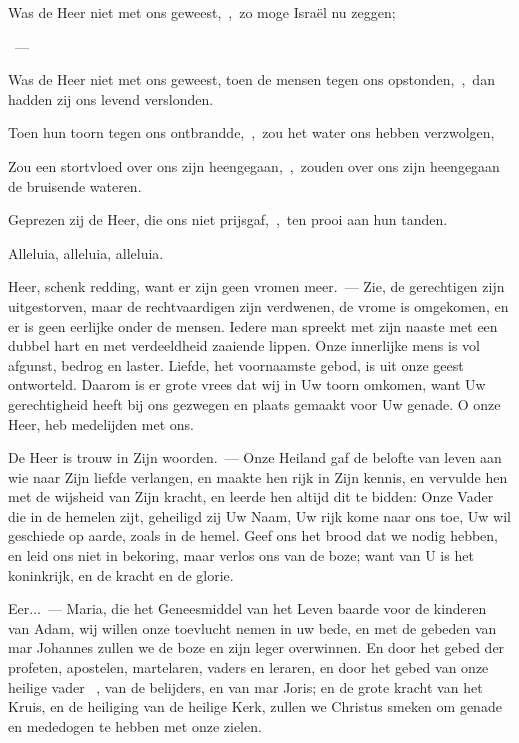 \documentclass[12pt,twoside,a5paper]{article}
\begin{document}
\begin{halfparskip}
  Was de Heer niet met ons geweest,~\sep\ zo moge Israël nu zeggen;

  ~--- 

  Was de Heer niet met ons geweest, toen de mensen tegen ons opstonden,~\sep\ dan hadden zij ons levend verslonden.

  Toen hun toorn tegen ons ontbrandde,~\sep\ zou het water ons hebben verzwolgen,

  Zou een stortvloed over ons zijn heengegaan,~\sep\ zouden over ons zijn heengegaan de bruisende wateren.

  Geprezen zij de Heer, die ons niet prijsgaf,~\sep\ ten prooi aan hun tanden.
\end{halfparskip}

 Alleluia, alleluia, alleluia.




\begin{halfparskip}
  Heer, schenk redding, want er zijn geen vromen meer.~--- Zie, de gerechtigen zijn uitgestorven, maar de rechtvaardigen zijn verdwenen, de vrome is omgekomen, en er is geen eerlijke onder de mensen. Iedere man spreekt met zijn naaste met een dubbel hart en met verdeeldheid zaaiende lippen. Onze innerlijke mens is vol afgunst, bedrog en laster. Liefde, het voornaamste gebod, is uit onze geest ontworteld. Daarom is er grote vrees dat wij in Uw toorn omkomen, want Uw gerechtigheid heeft bij ons gezwegen en plaats gemaakt voor Uw genade. O onze Heer, heb medelijden met ons.

  De Heer is trouw in Zijn woorden.~--- Onze Heiland gaf de belofte van leven aan wie naar Zijn liefde verlangen, en maakte hen rijk in Zijn kennis, en vervulde hen met de wijsheid van Zijn kracht, en leerde hen altijd dit te bidden: Onze Vader die in de hemelen zijt, geheiligd zij Uw Naam, Uw rijk kome naar ons toe, Uw wil geschiede op aarde, zoals in de hemel. Geef ons het brood dat we nodig hebben, en leid ons niet in bekoring, maar verlos ons van de boze; want van U is het koninkrijk, en de kracht en de glorie.

  Eer...~--- Maria, die het Geneesmiddel van het Leven baarde voor de kinderen van Adam, wij willen onze toevlucht nemen in uw bede, en met de gebeden van mar Johannes zullen we de boze en zijn leger overwinnen. En door het gebed der profeten, apostelen, martelaren, vaders en leraren, en door het gebed van onze heilige vader \NN~\liturgicalhint{[patroon]}, van de belijders, en van mar Joris; en de grote kracht van het Kruis, en de heiliging van de heilige Kerk, zullen we Christus smeken om genade en mededogen te hebben met onze zielen.
\end{halfparskip}
\end{document}
